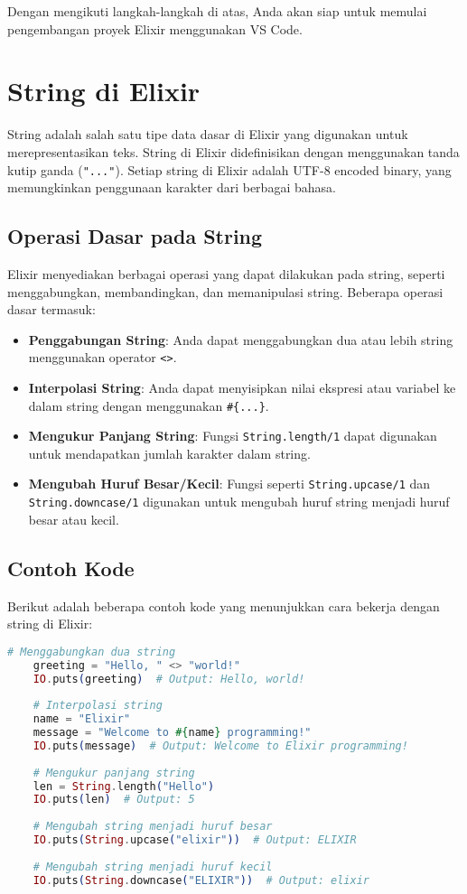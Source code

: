 Dengan mengikuti langkah-langkah di atas, Anda akan siap untuk memulai pengembangan proyek Elixir menggunakan VS Code.

\section{String di Elixir}

String adalah salah satu tipe data dasar di Elixir yang digunakan untuk merepresentasikan teks. String di Elixir didefinisikan dengan menggunakan tanda kutip ganda (\texttt{"..."}). Setiap string di Elixir adalah UTF-8 encoded binary, yang memungkinkan penggunaan karakter dari berbagai bahasa.

\subsection{Operasi Dasar pada String}

Elixir menyediakan berbagai operasi yang dapat dilakukan pada string, seperti menggabungkan, membandingkan, dan memanipulasi string. Beberapa operasi dasar termasuk:

\begin{itemize}
	\item \textbf{Penggabungan String}: Anda dapat menggabungkan dua atau lebih string menggunakan operator \texttt{<>}.
	\item \textbf{Interpolasi String}: Anda dapat menyisipkan nilai ekspresi atau variabel ke dalam string dengan menggunakan \texttt{\#\{...\}}.
	\item \textbf{Mengukur Panjang String}: Fungsi \texttt{String.length/1} dapat digunakan untuk mendapatkan jumlah karakter dalam string.
	\item \textbf{Mengubah Huruf Besar/Kecil}: Fungsi seperti \texttt{String.upcase/1} dan \texttt{String.downcase/1} digunakan untuk mengubah huruf string menjadi huruf besar atau kecil.
\end{itemize}

\subsection{Contoh Kode}

Berikut adalah beberapa contoh kode yang menunjukkan cara bekerja dengan string di Elixir:

\begin{lstlisting}[language=Elixir]
	# Menggabungkan dua string
	greeting = "Hello, " <> "world!"
	IO.puts(greeting)  # Output: Hello, world!
	
	# Interpolasi string
	name = "Elixir"
	message = "Welcome to #{name} programming!"
	IO.puts(message)  # Output: Welcome to Elixir programming!
	
	# Mengukur panjang string
	len = String.length("Hello")
	IO.puts(len)  # Output: 5
	
	# Mengubah string menjadi huruf besar
	IO.puts(String.upcase("elixir"))  # Output: ELIXIR
	
	# Mengubah string menjadi huruf kecil
	IO.puts(String.downcase("ELIXIR"))  # Output: elixir
\end{lstlisting}

